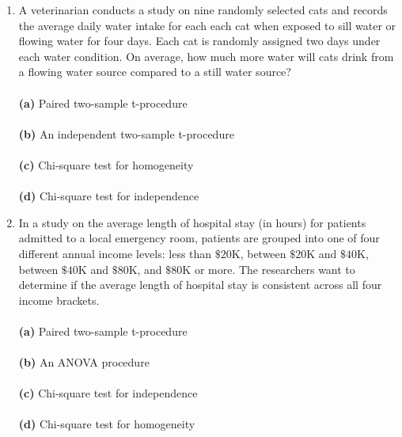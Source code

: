 \documentclass[12pt]{article}
\begin{document}
\begin{enumerate}[leftmargin=\labelsep]
\item A veterinarian conducts a study on nine randomly selected cats and records the average daily water intake for each each cat when exposed to sill water or flowing water for four days. Each cat is randomly assigned two days under each water condition. On average, how much more water will cats drink from a flowing water source compared to a still water source?\\ \vspace{1mm}\\
{\bf (a)} \hspace{2mm} Paired two-sample t-procedure\\ \vspace{1mm}\\
{\bf (b)} \hspace{2mm} An independent two-sample t-procedure\\   \vspace{1mm}\\
{\bf (c)} \hspace{2mm} Chi-square test for homogeneity\\  \vspace{1mm}\\
{\bf (d)} \hspace{2mm} Chi-square test for independence\\

\item In a study on the average length of hospital stay (in hours) for patients admitted to a local emergency room, patients are grouped into one of four different annual income levels: less than $\$20$K, between $\$20$K and $\$40$K, between $\$40$K and $\$80$K, and $\$80$K or more. The researchers want to determine if the average length of hospital stay is consistent across all four income brackets.\\ \vspace{1mm}\\
{\bf (a)} \hspace{2mm} Paired two-sample t-procedure\\ \vspace{1mm}\\
{\bf (b)} \hspace{2mm} An ANOVA procedure\\   \vspace{1mm}\\
{\bf (c)} \hspace{2mm} Chi-square test for independence\\  \vspace{1mm}\\
{\bf (d)} \hspace{2mm} Chi-square test for homogeneity\\


\end{enumerate}
\end{document}
